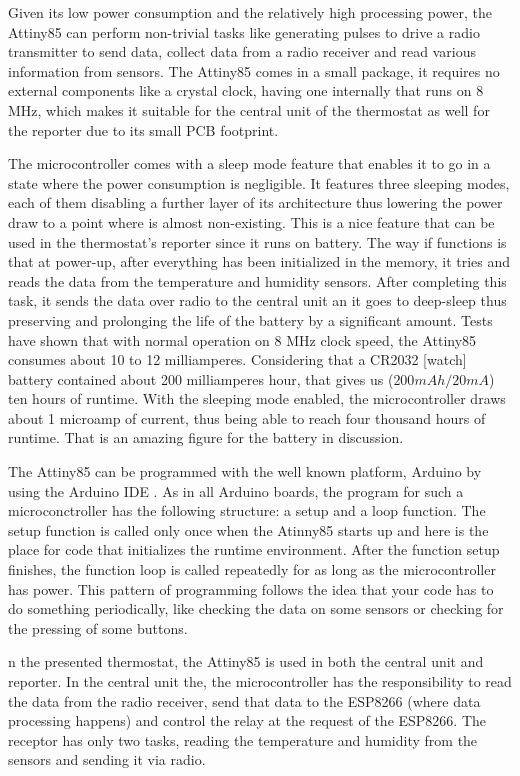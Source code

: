 \qquad Given its low power consumption and the relatively high processing power, the Attiny85 can perform non-trivial
tasks like generating pulses to drive a radio transmitter to send data, collect data from a
radio receiver and read various information from sensors.
The Attiny85 comes in a small package, it requires no external components like a crystal clock, having one
internally that runs on 8 MHz, which makes it suitable for the central unit of the thermostat as well for the
reporter due to its small PCB footprint.

\qquad The microcontroller comes with a sleep mode feature that enables it to go in a state where the power
consumption is negligible. It features three sleeping modes, each of them disabling a further layer
of its architecture thus lowering the power draw to a point where is almost non-existing.
This is a nice feature that can be used in the thermostat's reporter since it runs on battery.
The way if functions is that at power-up, after everything has been initialized in the memory, it tries and
reads the data from the temperature and humidity sensors. After completing this task, it sends the data over
radio to the central unit an it goes to deep-sleep thus preserving and prolonging the life of the battery
by a significant amount. Tests \cite{website:attiny_sleep_tests} have shown that with normal operation on
8 MHz clock speed, the Attiny85 consumes about 10 to 12 milliamperes. Considering that a CR2032 [watch]
battery contained about 200 milliamperes hour, that gives us ($200 mAh / 20 mA$) ten hours of runtime.
With the sleeping mode enabled, the microcontroller draws about 1 microamp of current, thus being able to reach
four thousand hours of runtime. That is an amazing figure for the battery in discussion.

\qquad The Attiny85 can be programmed with the well known platform, Arduino by using the Arduino IDE
\cite{website:attiny85program}.
As in all Arduino boards, the program for such a microconctroller has the following structure: a setup
and a loop function. The setup function is called only once when the Atinny85 starts up and here is the place
for code that initializes the runtime environment. After the function setup finishes, the function loop
is called repeatedly for as long as the microcontroller has power. This pattern of programming follows the
idea that your code has to do something periodically, like checking the data on some sensors or checking for
the pressing of some buttons.

\qquad n the presented thermostat, the Attiny85 is used in both the central unit and reporter. In the central unit
the, the microcontroller has the responsibility to read the data from the radio receiver, send that data to
the ESP8266 (where data processing happens) and control the relay at the request of the ESP8266.
The receptor has only two tasks, reading the temperature and humidity from the sensors and sending it via
radio.

